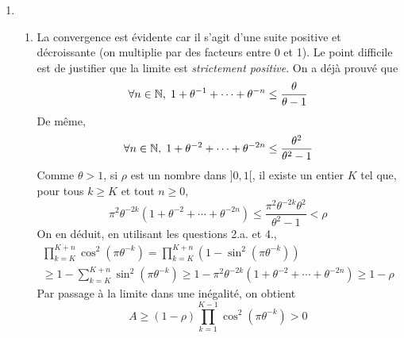 \begin{enumerate}
 \item
\begin{enumerate}
 \item La convergence est évidente car il s'agit d'une suite positive et décroissante (on multiplie par des facteurs entre 0 et 1). Le point difficile est de justifier que la limite est \emph{strictement positive}.\newline
On a déjà prouvé que
\begin{displaymath}
 \forall n\in \mathbb{N},\; 1+\theta^{-1}+\cdots+\theta^{-n} \leq \frac{\theta}{\theta -1}
\end{displaymath}
De même, 
\begin{displaymath}
 \forall n\in \mathbb{N},\; 1+\theta^{-2}+\cdots+\theta^{-2n} \leq \frac{\theta^2}{\theta^2 -1}
\end{displaymath}
Comme $\theta>1$, si $\rho$ est un nombre dans $]0,1[$, il existe un entier $K$ tel que, pour tous $k\geq K$ et tout $n\geq 0$,
\begin{displaymath}
 \pi^2\theta^{-2k}\left( 1+\theta^{-2}+\cdots+\theta^{-2n}\right) \leq \frac{\pi^2\theta^{-2k}\theta^2}{\theta^2 -1} < \rho
\end{displaymath}
On en déduit, en utilisant les questions 2.a. et 4.,
\begin{multline*}
 \prod_{k=K}^{K+n}\cos^2(\pi \theta^{-k})
= \prod_{k=K}^{K+n}(1-\sin^2(\pi \theta^{-k}))\\
\geq 1- \sum_{k=K}^{K+n}\sin^2(\pi \theta^{-k})
\geq 1-\pi^2\theta^{-2k}\left( 1+\theta^{-2}+\cdots+\theta^{-2n}\right)\geq 1-\rho
\end{multline*}
Par passage à la limite dans une inégalité, on obtient 
\begin{displaymath}
 A\geq (1-\rho)\prod_{k=1}^{K-1}\cos^2(\pi \theta^{-k}) >0
\end{displaymath}


\end{enumerate}
\end{enumerate}
